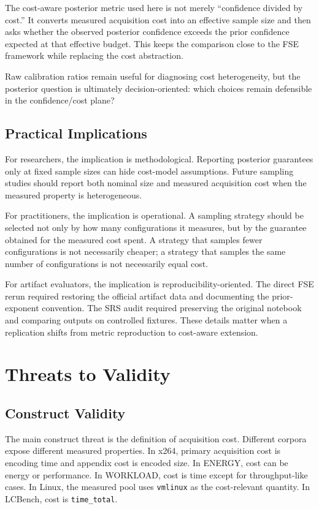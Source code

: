 \documentclass[smallcondensed]{svjour3}
\begin{document}
The cost-aware posterior metric used here is not merely ``confidence
divided by cost.'' It converts measured acquisition cost into an
effective sample size and then asks whether the observed posterior
confidence exceeds the prior confidence expected at that effective
budget. This keeps the comparison close to the FSE framework while
replacing the cost abstraction.

Raw calibration ratios remain useful for diagnosing cost heterogeneity,
but the posterior question is ultimately decision-oriented: which
choices remain defensible in the confidence/cost plane?

\subsection{Practical Implications}\label{practical-implications}

For researchers, the implication is methodological. Reporting posterior
guarantees only at fixed sample sizes can hide cost-model assumptions.
Future sampling studies should report both nominal size and measured
acquisition cost when the measured property is heterogeneous.

For practitioners, the implication is operational. A sampling strategy
should be selected not only by how many configurations it measures, but
by the guarantee obtained for the measured cost spent. A strategy that
samples fewer configurations is not necessarily cheaper; a strategy that
samples the same number of configurations is not necessarily equal cost.

For artifact evaluators, the implication is reproducibility-oriented.
The direct FSE rerun required restoring the official artifact data and
documenting the prior-exponent convention. The SRS audit required
preserving the original notebook and comparing outputs on controlled
fixtures. These details matter when a replication shifts from metric
reproduction to cost-aware extension.

\section{Threats to Validity}\label{threats-to-validity}

\subsection{Construct Validity}\label{construct-validity}

The main construct threat is the definition of acquisition cost.
Different corpora expose different measured properties. In x264, primary
acquisition cost is encoding time and appendix cost is encoded size. In
ENERGY, cost can be energy or performance. In WORKLOAD, cost is time
except for throughput-like cases. In Linux, the measured pool uses
\texttt{vmlinux} as the cost-relevant quantity. In LCBench, cost is
\texttt{time\_total}.
\end{document}
